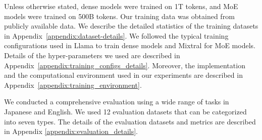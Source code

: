 Unless otherwise stated, dense models were trained on 1T tokens, and MoE models were trained on 500B tokens.
Our training data was obtained from publicly available data.
We describe the detailed statistics of the training datasets in Appendix~\ref{appendix:dataset-details}.
%
%
We followed the typical training configurations used in Llama to train dense models and Mixtral for MoE models.
%
Details of the hyper-parameters we used are described in Appendix~\ref{appendix:training_configs_details}.
Moreover, the implementation and the computational environment used in our experiments are described in Appendix~\ref{appendix:training_environment}.


We conducted a comprehensive evaluation using a wide range of tasks in Japanese and English. 
We used 12 evaluation datasets that can be categorized into seven types.
The details of the evaluation datasets and metrics are described in Appendix \ref{appendix:evaluation_details}.
